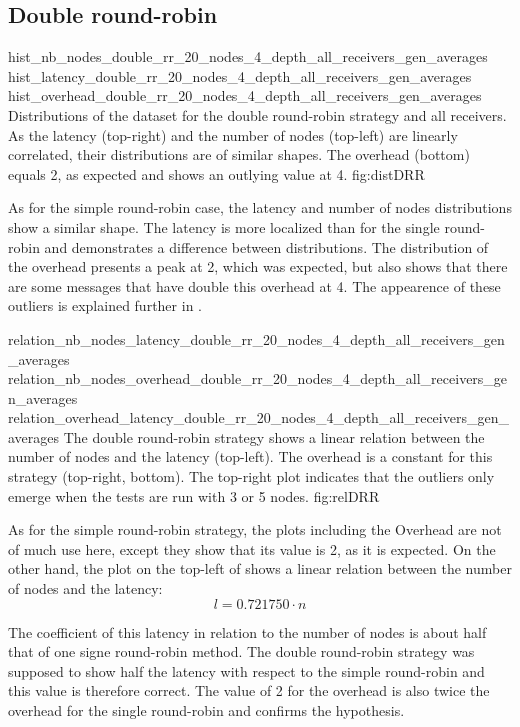 \FloatBarrier
\subsection{Double round-robin}
\label{ssec:doubleRR}
\triplefigure
    {hist_nb_nodes_double_rr_20_nodes_4_depth_all_receivers_gen_averages}
    {hist_latency_double_rr_20_nodes_4_depth_all_receivers_gen_averages}
    {hist_overhead_double_rr_20_nodes_4_depth_all_receivers_gen_averages}
    {Distributions of the dataset for the double round-robin strategy and all
    receivers. As the latency (top-right) and the number of nodes (top-left) are
    linearly correlated, their distributions are of similar shapes. The
    overhead (bottom) equals 2, as expected and shows an outlying value at 4.}
    {fig:distDRR}

As for the simple round-robin case, the latency and number of nodes
distributions show a similar shape. The latency is more localized than for the
single round-robin and demonstrates a difference between distributions. The
distribution of the overhead presents a peak at 2, which was expected, but also
shows that there are some messages that have double this overhead at 4. The
appearence of these outliers is explained further in . 

\triplefigure
    {relation_nb_nodes_latency_double_rr_20_nodes_4_depth_all_receivers_gen_averages}
    {relation_nb_nodes_overhead_double_rr_20_nodes_4_depth_all_receivers_gen_averages}
    {relation_overhead_latency_double_rr_20_nodes_4_depth_all_receivers_gen_averages}
    {The double round-robin strategy shows a linear relation between the number of
    nodes and the latency (top-left). The overhead is a constant for this
    strategy (top-right, bottom). The top-right plot indicates that the outliers
    only emerge when the tests are run with 3 or 5 nodes.}
    {fig:relDRR}

As for the simple round-robin strategy, the plots including the Overhead are not
of much use here, except they show that its value is 2, as it is expected. 
On the other hand, the plot on the top-left of  shows a
linear relation between the number of nodes and the latency: 
\[l = 0.721750 \cdot n\]

The coefficient of this latency in relation to the number of nodes is about half
that of one signe round-robin method. The double round-robin strategy was
supposed to show half the latency with respect to the simple round-robin and
this value is therefore correct. The value of 2 for the overhead is also twice
the overhead for the single round-robin and confirms the hypothesis.
    

